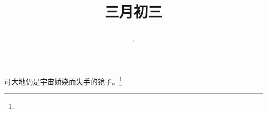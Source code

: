 \title{\date[d=11,m=4,y=2024][year:cn-y,年,month:cn,day:cn,日,·,weekday]·三月初三 }
可大地仍是宇宙娇娆而失手的镜子。\footnote{ }

